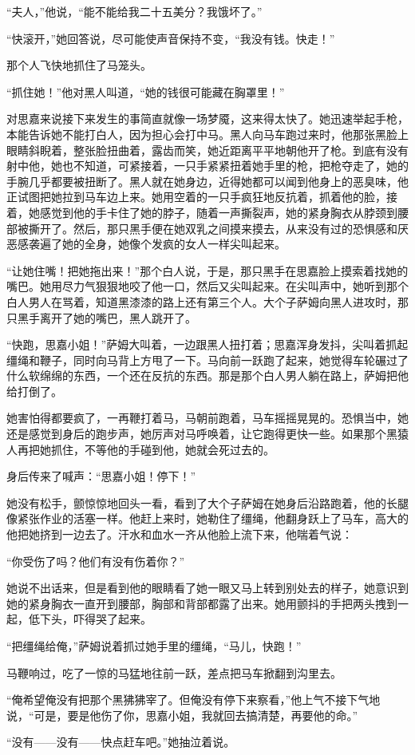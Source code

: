 \par “夫人，”他说，“能不能给我二十五美分？我饿坏了。”
\par “快滚开，”她回答说，尽可能使声音保持不变，“我没有钱。快走！”
\par 那个人飞快地抓住了马笼头。
\par “抓住她！”他对黑人叫道，“她的钱很可能藏在胸罩里！”
\par 对思嘉来说接下来发生的事简直就像一场梦魇，这来得太快了。她迅速举起手枪，本能告诉她不能打白人，因为担心会打中马。黑人向马车跑过来时，他那张黑脸上眼睛斜睨着，整张脸扭曲着，露齿而笑，她近距离平平地朝他开了枪。到底有没有射中他，她也不知道，可紧接着，一只手紧紧扭着她手里的枪，把枪夺走了，她的手腕几乎都要被扭断了。黑人就在她身边，近得她都可以闻到他身上的恶臭味，他正试图把她拉到马车边上来。她用空着的一只手疯狂地反抗着，抓着他的脸，接着，她感觉到他的手卡住了她的脖子，随着一声撕裂声，她的紧身胸衣从脖颈到腰部被撕开了。然后，那只黑手便在她双乳之间摸来摸去，从来没有过的恐惧感和厌恶感袭遍了她的全身，她像个发疯的女人一样尖叫起来。
\par “让她住嘴！把她拖出来！”那个白人说，于是，那只黑手在思嘉脸上摸索着找她的嘴巴。她用尽力气狠狠地咬了他一口，然后又尖叫起来。在尖叫声中，她听到那个白人男人在骂着，知道黑漆漆的路上还有第三个人。大个子萨姆向黑人进攻时，那只黑手离开了她的嘴巴，黑人跳开了。
\par “快跑，思嘉小姐！”萨姆大叫着，一边跟黑人扭打着；思嘉浑身发抖，尖叫着抓起缰绳和鞭子，同时向马背上方甩了一下。马向前一跃跑了起来，她觉得车轮碾过了什么软绵绵的东西，一个还在反抗的东西。那是那个白人男人躺在路上，萨姆把他给打倒了。
\par 她害怕得都要疯了，一再鞭打着马，马朝前跑着，马车摇摇晃晃的。恐惧当中，她还是感觉到身后的跑步声，她厉声对马呼唤着，让它跑得更快一些。如果那个黑猿人再把她抓住，不等他的手碰到他，她就会死过去的。
\par 身后传来了喊声：“思嘉小姐！停下！”
\par 她没有松手，颤惊惊地回头一看，看到了大个子萨姆在她身后沿路跑着，他的长腿像紧张作业的活塞一样。他赶上来时，她勒住了缰绳，他翻身跃上了马车，高大的他把她挤到一边去了。汗水和血水一齐从他脸上流下来，他喘着气说：
\par “你受伤了吗？他们有没有伤着你？”
\par 她说不出话来，但是看到他的眼睛看了她一眼又马上转到别处去的样子，她意识到她的紧身胸衣一直开到腰部，胸部和背部都露了出来。她用颤抖的手把两头拽到一起，低下头，吓得哭了起来。
\par “把缰绳给俺，”萨姆说着抓过她手里的缰绳，“马儿，快跑！”
\par 马鞭响过，吃了一惊的马猛地往前一跃，差点把马车掀翻到沟里去。
\par “俺希望俺没有把那个黑狒狒宰了。但俺没有停下来察看，”他上气不接下气地说，“可是，要是他伤了你，思嘉小姐，我就回去搞清楚，再要他的命。”
\par “没有——没有——快点赶车吧。”她抽泣着说。

